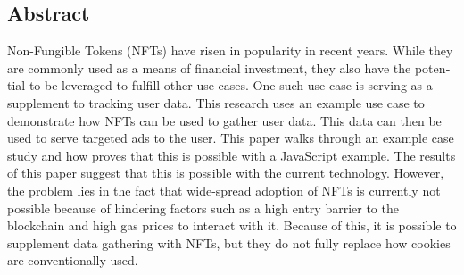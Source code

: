 

\begin{otherlanguage}{american}
	\chapter*{Abstract}
	Non-Fungible Tokens (NFTs) have risen in popularity in recent years. While they are commonly used as a means of financial investment, they also have the potential to be leveraged to fulfill other use cases. One such use case is serving as a supplement to tracking user data. This research uses an example use case to demonstrate how NFTs can be used to gather user data. This data can then be used to serve targeted ads to the user. This paper walks through an example case study and how proves that this is possible with a JavaScript example. The results of this paper suggest that this is possible with the current technology. However, the problem lies in the fact that wide-spread adoption of NFTs is currently not possible because of hindering factors such as a high entry barrier to the blockchain and high gas prices to interact with it. Because of this, it is possible to supplement data gathering with NFTs, but they do not fully replace how cookies are conventionally used.
\end{otherlanguage}